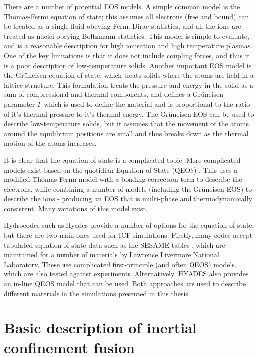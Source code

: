 There are a number of potential EOS models. A simple common model is the Thomas-Fermi equation of state; this assumes all electrons (free and bound) can be treated as a single fluid obeying Fermi-Dirac statistics, and all the ions are treated as nuclei obeying Boltzmann statistics. This model is simple to evaluate, and is a reasonable description for high ionisation and high temperature plasmas. One of the key limitations is that it does not include coupling forces, and thus it is a poor description of low-temperature solids. Another important EOS model is the Gr{\"u}neisen equation of state, which treats solids where the atoms are held in a lattice structure. This formulation treats the pressure and energy in the solid as a sum of compressional and thermal components, and defines a Gr{\"u}neisen parameter $\Gamma$ which is used to define the material and is proportional to the ratio of it's thermal pressure to it's thermal energy. The Gr{\"u}neisen EOS can be used to describe low-temperature solids, but it assumes that the movement of the atoms around the equilibrium positions are small and thus breaks down as the thermal motion of the atoms increases.

It is clear that the equation of state is a complicated topic. More complicated models exist based on the quotidian Equation of State (QEOS) \cite{More1988}. This uses a modified Thomas-Fermi model with a bonding correction term to describe the electrons, while combining a number of models (including the Gr{\"u}neisen EOS) to describe the ions - producing an EOS that is multi-phase and thermodynamically consistent. Many variations of this model exist. 

Hydrocodes such as Hyades provide a number of options for the equation of state, but there are two main ones used for ICF simulations. Firstly, many codes accept tabulated equation of state data such as the SESAME tables \cite{SESAMEgeneric}, which are maintained for a number of materials by Lawrence Livermore National Laboratory. These use complicated first-principle (and often QEOS) models, which are also tested against experiments. Alternatively, HYADES also provides an in-line QEOS model that can be used. Both approaches are used to describe different materials in the simulations presented in this thesis.

\section{Basic description of inertial confinement fusion}

